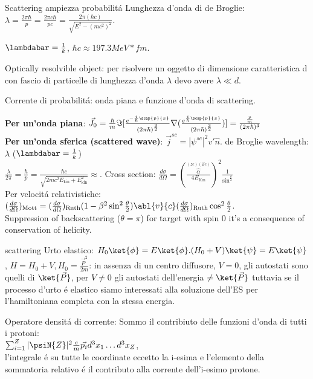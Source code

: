 \begin{wordonframe}{Scattering ampiezza probabilit\'a}
Lunghezza d'onda di de Broglie: $\lambda=\frac{2\pi \hbar}{p}=\frac{2\pi c\hbar}{pc}=\frac{2\pi (\hbar c)}{\sqrt{E^2-(mc^2)^2}}$.

$\lambdabar=\frac{1}{k}$, $\hbar c\approx 197.3 MeV*fm$.

Optically resolvible object:
per risolvere un oggetto di dimensione caratteristica d con fascio di particelle di lunghezza d'onda $\lambda$ devo avere $\lambda\ll d$.

Corrente di  probabilit\'a: onda piana e funzione d'onda di scattering.

\textbf{Per un'onda piana}: $\vec{J_0}=\frac{\hbar}{m}\Im{[\frac{e^{-\frac{i}{\hbar}\scap{p}{x}}}{(2\pi\hbar)^{\frac{3}{2}}}\nabla(\frac{e^{\frac{i}{\hbar}\scap{p}{x}}}{(2\pi\hbar)^{\frac{3}{2}}})]}=\frac{\frac{p}{m}}{(2\pi\hbar)^3}$\\
\textbf{Per un'onda sferica (scattered wave)}: $\vec{j}^{sc}=|\psi^{sc}|^2v'\hat{n}$.
de Broglie wavelength: $\lambda$ ($\lambdabar=\frac{1}{k}$)\\
$\frac{\lambda}{2\pi}=\frac{\hbar}{p}=\frac{\hbar c}{\sqrt{2mc^2E_{\text{kin}}+E_{\text{kin}}^2}}\approx$.
Cross section:
$\frac{d\sigma}{d\Omega}=(\frac{\overbrace{\alpha}^{(ze)(Ze)}}{4E_{\text{Kin}}})^2\frac{1}{\sin^{\frac{\theta}{2}}}$\\
Per velocit\'a relativistiche:\\
$(\frac{d\sigma}{d\Omega})_{\text{Mott}}=(\frac{d\sigma}{d\Omega})_{\text{Ruth}}(1-\beta^2\sin^2{\frac{\theta}{2}})\abl{v}{c}(\frac{d\sigma}{d\Omega})_{\text{Ruth}}\cos^2{\frac{\theta}{2}}$.\\
Suppression of backscattering ($\theta=\pi$) for target with spin 0 it's a consequence of conservation of helicity.
\end{wordonframe}

\begin{wordonframe}{scattering}
 Urto elastico:
 $H_0\ket{\phi}=E\ket{\phi}. (H_0+V)\ket{\psi}=E\ket{\psi}$, $H=H_0+V, H_0=\frac{\vec{P}^2}{2m}$: in assenza di un centro diffusore, $V=0$, gli autostati sono quelli di $\ket{\vec{P}}$,  per $V\neq0$ gli autostati dell'energia $\neq \ket{\vec{P}}$ tuttavia se il processo d'urto \'e elastico siamo interessati alla soluzione dell'ES per l'hamiltoniana completa con la stessa energia.

Operatore densit\'a di corrente:
Sommo il contribiuto delle funzioni d'onda di tutti i protoni:\\
$\sum_{i=1}^Z|\psiN{Z}|^2\frac{e}{m}\vec{p_i}d^3x_1\ldots d^3x_Z$,\\
 l'integrale \'e su tutte le coordinate eccetto la i-esima e l'elemento della sommatoria relativo \'e il contributo alla corrente dell'i-esimo protone.

\end{wordonframe}

